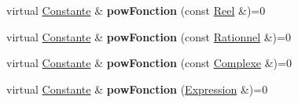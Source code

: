 \begin{DoxyCompactItemize}
\item 
\hypertarget{class_constante_aac4655c82f3adc298c242c1858a185de}{virtual \hyperlink{class_constante}{Constante} \& {\bfseries pow\-Fonction} (const \hyperlink{class_reel}{Reel} \&)=0}\label{class_constante_aac4655c82f3adc298c242c1858a185de}

\item 
\hypertarget{class_constante_acfa643e1f95d98b3eafb4275bbb533d5}{virtual \hyperlink{class_constante}{Constante} \& {\bfseries pow\-Fonction} (const \hyperlink{class_rationnel}{Rationnel} \&)=0}\label{class_constante_acfa643e1f95d98b3eafb4275bbb533d5}

\item 
\hypertarget{class_constante_aae63d1d974ef6fe0f516ce1cfcaff5eb}{virtual \hyperlink{class_constante}{Constante} \& {\bfseries pow\-Fonction} (const \hyperlink{class_complexe}{Complexe} \&)=0}\label{class_constante_aae63d1d974ef6fe0f516ce1cfcaff5eb}

\item 
\hypertarget{class_constante_ae7639614d627f4a87e477095e65b4896}{virtual \hyperlink{class_constante}{Constante} \& {\bfseries pow\-Fonction} (\hyperlink{class_expression}{Expression} \&)=0}\label{class_constante_ae7639614d627f4a87e477095e65b4896}


\end{DoxyCompactItemize}
